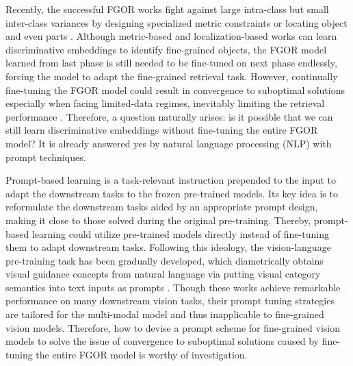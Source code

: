 \documentclass[letterpaper]{article} %
\begin{document}
Recently, the successful FGOR works fight against large intra-class but small inter-class variances by designing specialized metric constraints \cite{DBLP:conf/eccv/TehDT20,DBLP:conf/cvpr/WangHHDS19,DBLP:conf/eccv/BoudiafRZGPPA20} or locating object and even parts \cite{DBLP:journals/tip/WeiLWZ17,DBLP:conf/ijcai/ZhengJSWHY18,DBLP:conf/wacv/MoskvyakMDB21}. Although metric-based and localization-based works can learn discriminative embeddings to identify fine-grained objects, the FGOR model learned from last phase is still needed to be fine-tuned on next phase endlessly, forcing the model to adapt the fine-grained retrieval task. However, continually fine-tuning the FGOR model could result in convergence to suboptimal solutions especially when facing limited-data regimes, inevitably limiting the retrieval performance \cite{DBLP:conf/cvpr/HuangZGS21, DBLP:conf/icml/ZintgrafSKHW19}. Therefore, a question naturally arises: is it possible that we can still learn discriminative embeddings without fine-tuning the entire FGOR model? It is already answered yes by natural language processing (NLP) with prompt techniques.



Prompt-based learning \cite{DBLP:journals/corr/abs-2208-10159} is a task-relevant instruction prepended to the input to adapt the downstream tasks to the frozen pre-trained models.
Its key idea is to reformulate the downstream tasks aided by an appropriate prompt design, making it close to those solved during the original pre-training.
Thereby, prompt-based learning could utilize pre-trained models directly instead of fine-tuning them to adapt downstream tasks.
Following this ideology, the vision-language pre-training task has been gradually developed, which diametrically obtains visual guidance concepts from natural language via putting visual category semantics into text inputs as prompts \cite{DBLP:conf/icml/JiaYXCPPLSLD21, DBLP:conf/iccv/KamathSLSMC21, DBLP:conf/icml/RadfordKHRGASAM21}.
Though these works achieve remarkable performance on many downstream vision tasks, their prompt tuning strategies are tailored for the multi-modal model and thus inapplicable to fine-grained vision models. Therefore, how to devise a prompt scheme for fine-grained vision models to solve the issue  of convergence to suboptimal solutions caused by fine-tuning the entire FGOR model is worthy of investigation.
\end{document}
